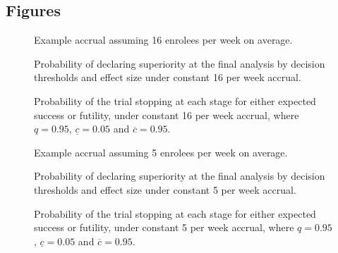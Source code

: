 \documentclass{bmcart}
\begin{document}
\begin{backmatter}


\section*{Figures}

\begin{figure}[h!] 	  	  	  
	\caption{Example accrual assuming 16 enrolees per week on average.}
	\label{fig:accrual-16}
\end{figure}

\begin{figure}[h!]
	\caption{Probability of declaring superiority at the final analysis by decision thresholds and effect size under constant 16 per week accrual.}
	\label{fig:decisions-16}
\end{figure}

\begin{figure}[h!]
\caption{Probability of the trial stopping at each stage for either expected success or futility, under constant 16 per week accrual, where \(q=0.95\), \(\underline{c}=0.05\) and \(\overline{c}=0.95\).}\label{fig:stop-16}
\end{figure}


\begin{figure}[h!] 	  	  	  
	\caption{Example accrual assuming 5 enrolees per week on average.}
	\label{fig:accrual-5}
\end{figure}

\begin{figure}[h!]
	\caption{Probability of declaring superiority at the final analysis by decision thresholds and effect size under constant 5 per week accrual.}
	\label{fig:decisions-5}
\end{figure}

\begin{figure}[h!]
	\caption{Probability of the trial stopping at each stage for either expected success or futility, under constant 5 per week accrual, where \(q=0.95\), \(\underline{c}=0.05\) and \(\overline{c}=0.95\).}\label{fig:stop-5}
\end{figure}


\end{backmatter}
\end{document}
